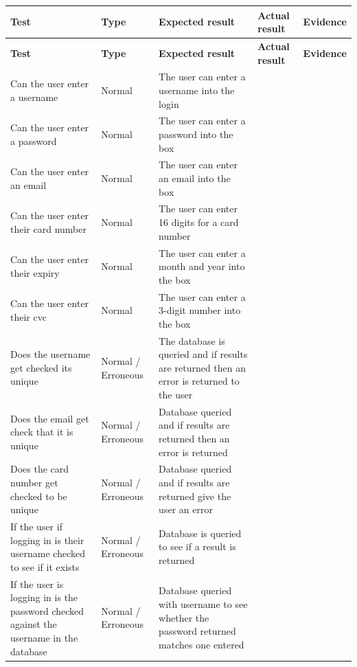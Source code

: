 \begin{center}
\begin{longtable}{|P{3cm}|P{1.7cm}|P{3cm}|P{2.6cm}|P{2cm}|}
  \hline
  \textbf{Test} & \textbf{Type} & \textbf{Expected result} & \textbf{Actual result} & \textbf{Evidence} \\
  \hline
  \endfirsthead
  \hline
  \textbf{Test} & \textbf{Type} & \textbf{Expected result} & \textbf{Actual result} & \textbf{Evidence} \\
  \hline
  \endhead
  \hline 

  \endfoot
  \endlastfoot

  Can the user enter a username & Normal & The user can enter a username into the login & ~ & ~ \\ \hline
        Can the user enter a password & Normal & The user can enter a password into the box & ~ & ~ \\ \hline
        Can the user enter an email & Normal & The user can enter an email into the box & ~ & ~ \\ \hline
        Can the user enter their card number & Normal & The user can enter 16 digits for a card number & ~ & ~ \\ \hline
        Can the user enter their expiry & Normal & The user can enter a month and year into the box & ~ & ~ \\ \hline
        Can the user enter their cvc & Normal & The user can enter a 3-digit number into the box & ~ & ~ \\ \hline
        Does the username get checked its unique & Normal / Erroneous & The database is queried and if results are returned then an error is returned to the user & ~ & ~ \\ \hline
        Does the email get check that it is unique & Normal / Erroneous & Database queried and if results are returned then an error is returned & ~ & ~ \\ \hline
        Does the card number get checked to be unique & Normal / Erroneous & Database queried and if results are returned give the user an error & ~ & ~ \\ \hline
        If the user if logging in is their username checked to see if it exists & Normal / Erroneous & Database is queried to see if a result is returned & ~ & ~ \\ \hline
        If the user is logging in is the password checked against the username in the database & Normal / Erroneous & Database queried with username to see whether the password returned matches one entered & ~ & ~ \\ \hline

\end{longtable}
\end{center}
